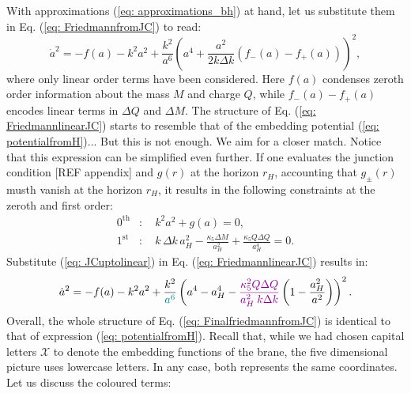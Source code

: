 With approximations (\ref{eq: approximations_bh}) at hand, let us substitute them in Eq. (\ref{eq: FriedmannfromJC}) to read:
\begin{equation}\label{eq: FriedmannlinearJC}
    \dot{a}^2 = -f(a)-k^2 a^2+\frac{k^2}{a^6}\left( a^4 +\frac{a^2}{2k\Delta k}\left( f_{-}(a)-f_{+}(a)\right)\right)^2,
\end{equation}
where only linear order terms have been considered. Here $f(a)$ condenses zeroth order information about the mass $M$ and charge $Q$, while $f_{-}(a)-f_{+}(a)$ encodes linear terms in $\Delta Q$ and $\Delta M$. The structure of Eq. (\ref{eq: FriedmannlinearJC}) starts to resemble that of the embedding potential (\ref{eq: potentialfromH})... But this is not enough. We aim for a closer match. Notice that this expression can be simplified even further. If one evaluates the junction condition [REF appendix] and $g(r)$ at the horizon $r_{H}$, accounting that $g_{\pm}(r)$ musth vanish at the horizon $r_{H}$, it results in the following constraints at the zeroth and first order:
\begin{equation}\label{eq: JCuptolinear}
\begin{split}
    \textbf{$0^{\text{th}}$}&: \quad k^2 a^2 +g(a)=0, \\
    \textbf{$1^{\text{st}}$}&: \quad k \, \Delta k \, a_H^2-\frac{\kappa_5 \Delta M}{a_H^2}+\frac{\kappa_5 Q \Delta Q}{ a_H^4}=0.
\end{split}
\end{equation}
Substitute (\ref{eq: JCuptolinear}) in Eq. (\ref{eq: FriedmannlinearJC}) results in:
\begin{equation}\label{eq: FinalfriedmannfromJC}
    \dot{a}^2= -f(a)-k^2 a^2+\frac{k^2}{\textcolor{teal}{a^6}}\left( a^4-a_H^4 - \textcolor{violet}{\frac{\kappa_{5}^{2}Q \Delta Q}{a_{H}^{2}\:k \Delta k }} \left(1-\frac{a_H^2}{a^2} \right) \right) ^2.
\end{equation}
Overall, the whole structure of Eq. (\ref{eq: FinalfriedmannfromJC}) is identical to that of expression (\ref{eq: potentialfromH}). Recall that, while we had chosen capital letters $\mathcal{X}$ to denote the embedding functions of the brane, the five dimensional picture uses lowercase letters. In any case, both represents the same coordinates. Let us discuss the coloured terms:

